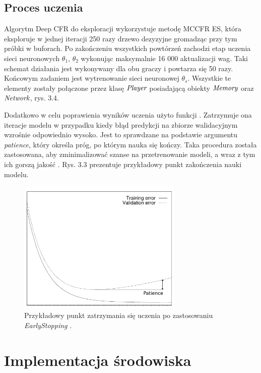 \documentclass[12pt,oneside,a4paper]{report}
\begin{document}
\subsection{Proces uczenia}

Algorytm Deep CFR do eksploracji wykorzystuje metodę MCCFR ES, która eksploruje w jednej iteracji
250 razy drzewo dezyzyjne gromadząc przy tym próbki w buforach.
Po zakończeniu 
wszystkich powtórzeń zachodzi etap uczenia sieci neuronowych $\theta_{1}$, $\theta_{2}$
wykonując maksymalnie 16 000 aktualizacji wag.
Taki schemat działania jest wykonywany dla obu graczy i powtarza się 50 razy. Końcowym
zadaniem jest wytrenowanie sieci neuronowej $\theta_{s}$.  
Wszystkie te elementy zostały połączone przez klasę $\emph{Player}$ posiadającą obiekty
$\emph{Memory}$
oraz $\emph{Network}$, rys. 3.4. 

Dodatkowo w celu poprawienia wyników uczenia użyto funkcji  \cite{tensorflow}.
Zatrzymuje ona iteracje modelu w przypadku kiedy błąd predykcji na zbiorze
walidacyjnym wzrośnie odpowiednio wysoko. Jest to sprawdzane na podstawie argumentu \emph{patience},
który określa próg, po którym nauka się kończy. Taka procedura została zastosowana, aby
zminimalizować szanse na przetrenowanie modeli, a wraz z tym ich gorszą jakość \cite{early}.
Rys. 3.3 prezentuje przykładowy punkt zakończenia nauki modelu.

\begin{figure}[!ht]
  \centering
  \includegraphics[width=0.7\textwidth]{./img/early.pdf}
  \caption{Przykładowy punkt zatrzymania się uczenia po zastosowaniu \emph{EarlyStopping} \cite{early}.}
\end{figure}

\section{Implementacja środowiska}
\end{document}
